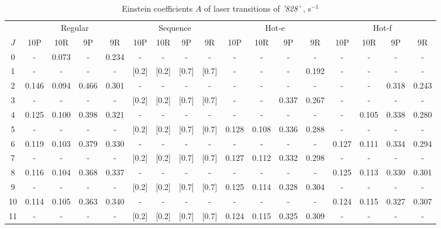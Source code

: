 \documentclass{report}
\begin{document}
\begin{appendices}
\begin{table}
\centering
\caption{Einstein coefficients $A$ of laser transitions of \textit{'828'} , s$^{-1}$}
\label{table:A828}
\scriptsize
\begin{tabular}{|c|cccc|cccc|cccc|cccc|}
\hline
& \multicolumn{4}{c|}{Regular}& \multicolumn{4}{c|}{Sequence}& \multicolumn{4}{c|}{Hot-e}& \multicolumn{4}{c|}{Hot-f}\\
$J$ & 10P & 10R & 9P & 9R & 10P & 10R & 9P & 9R & 10P & 10R & 9P & 9R & 10P & 10R & 9P & 9R\\ 
\hline
0  &   -   & 0.073 &   -   & 0.234 &   -   &   -   &   -   &   -   &   -   &   -   &   -   &   -   &   -   &   -   &   -   &   -  \\
1  &   -   &   -   &   -   &   -   & [0.2] & [0.2] & [0.7] & [0.7] &   -   &   -   &   -   & 0.192 &   -   &   -   &   -   &   -  \\
2  & 0.146 & 0.094 & 0.466 & 0.301 &   -   &   -   &   -   &   -   &   -   &   -   &   -   &   -   &   -   &   -   & 0.318 & 0.243\\
3  &   -   &   -   &   -   &   -   & [0.2] & [0.2] & [0.7] & [0.7] &   -   &   -   & 0.337 & 0.267 &   -   &   -   &   -   &   -  \\
4  & 0.125 & 0.100 & 0.398 & 0.321 &   -   &   -   &   -   &   -   &   -   &   -   &   -   &   -   &   -   & 0.105 & 0.338 & 0.280\\
5  &   -   &   -   &   -   &   -   & [0.2] & [0.2] & [0.7] & [0.7] & 0.128 & 0.108 & 0.336 & 0.288 &   -   &   -   &   -   &   -  \\
6  & 0.119 & 0.103 & 0.379 & 0.330 &   -   &   -   &   -   &   -   &   -   &   -   &   -   &   -   & 0.127 & 0.111 & 0.334 & 0.294\\
7  &   -   &   -   &   -   &   -   & [0.2] & [0.2] & [0.7] & [0.7] & 0.127 & 0.112 & 0.332 & 0.298 &   -   &   -   &   -   &   -  \\
8  & 0.116 & 0.104 & 0.368 & 0.337 &   -   &   -   &   -   &   -   &   -   &   -   &   -   &   -   & 0.125 & 0.113 & 0.330 & 0.301\\
9  &   -   &   -   &   -   &   -   & [0.2] & [0.2] & [0.7] & [0.7] & 0.125 & 0.114 & 0.328 & 0.304 &   -   &   -   &   -   &   -  \\
10 & 0.114 & 0.105 & 0.363 & 0.340 &   -   &   -   &   -   &   -   &   -   &   -   &   -   &   -   & 0.124 & 0.115 & 0.327 & 0.307\\
11 &   -   &   -   &   -   &   -   & [0.2] & [0.2] & [0.7] & [0.7] & 0.124 & 0.115 & 0.325 & 0.309 &   -   &   -   &   -   &   -  \\

\end{tabular}
\end{table}
\end{appendices}
\end{document}
